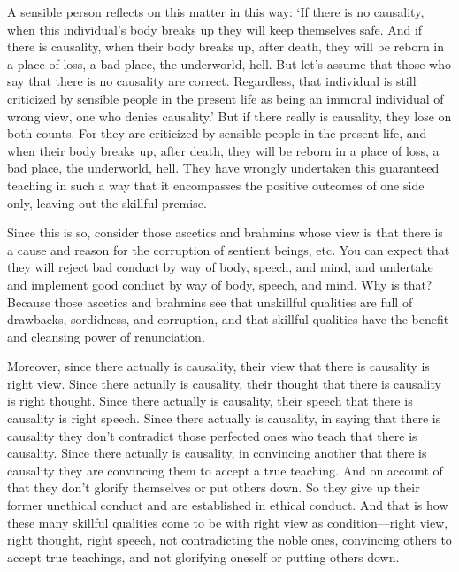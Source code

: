\documentclass[12pt,openany]{book}%
\begin{document}
A sensible person reflects on this matter in this way: ‘If there is no causality, when this individual’s body breaks up they will keep themselves safe. And if there is causality, when their body breaks up, after death, they will be reborn in a place of loss, a bad place, the underworld, hell. But let’s assume that those who say that there is no causality are correct. Regardless, that individual is still criticized by sensible people in the present life as being an immoral individual of wrong view, one who denies causality.’ But if there really is causality, they lose on both counts. For they are criticized by sensible people in the present life, and when their body breaks up, after death, they will be reborn in a place of loss, a bad place, the underworld, hell. They have wrongly undertaken this guaranteed teaching in such a way that it encompasses the positive outcomes of one side only, leaving out the skillful premise. 

Since this is so, consider those ascetics and brahmins whose view is that there is a cause and reason for the corruption of sentient beings, etc. You can expect that they will reject bad conduct by way of body, speech, and mind, and undertake and implement good conduct by way of body, speech, and mind. Why is that? Because those ascetics and brahmins see that unskillful qualities are full of drawbacks, sordidness, and corruption, and that skillful qualities have the benefit and cleansing power of renunciation. 

Moreover, since there actually is causality, their view that there is causality is right view. Since there actually is causality, their thought that there is causality is right thought. Since there actually is causality, their speech that there is causality is right speech. Since there actually is causality, in saying that there is causality they don’t contradict those perfected ones who teach that there is causality. Since there actually is causality, in convincing another that there is causality they are convincing them to accept a true teaching. And on account of that they don’t glorify themselves or put others down. So they give up their former unethical conduct and are established in ethical conduct. And that is how these many skillful qualities come to be with right view as condition—right view, right thought, right speech, not contradicting the noble ones, convincing others to accept true teachings, and not glorifying oneself or putting others down. 
\end{document}
